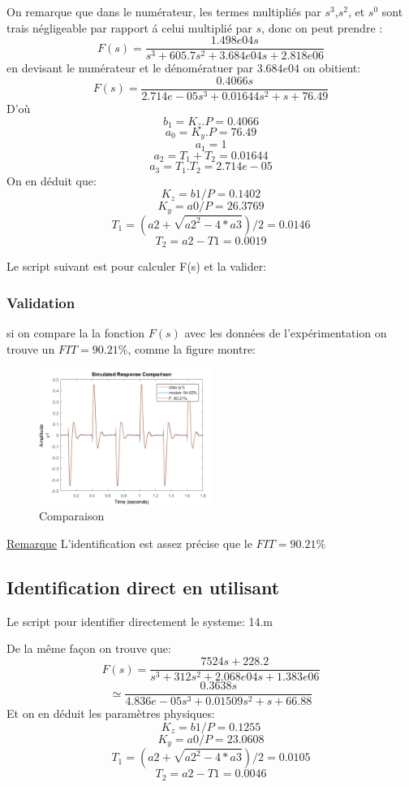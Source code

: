 \documentclass[twoside,twocolumn]{article}
\begin{document}
On remarque que dans le numérateur, les termes multipliés par $s^3$,$s^2$, et $s^0$ sont trais négligeable par rapport á celui multiplié par $s$, donc on peut prendre :
$$ F(s) = \frac{1.498e04 s}{s^3 + 605.7 s^2 + 3.684e04 s + 2.818e06} $$
en devisant le numérateur et le dénomératuer par $3.684e04$ on obitient:
$$F(s)=\frac{0.4066 s}{  2.714e-05 s^3 + 0.01644 s^2 + s + 76.49}$$
D'où 
$$b_1 = K_z.P = 0.4066$$ $$a_0 = K_y.P =  76.49$$ $$a_1 = 1$$ $$a_2 = T_1+T_2 = 0.01644$$ $$a_3 = T_1.T_2 =2.714e-05$$
On en déduit que:
$$K_z = b1 / P = 0.1402$$
$$K_y = a0/P =26.3769 $$
$$T_1 = (a2+\sqrt{a2^2-4*a3})/2 = 0.0146$$
$$T_2 = a2-T1 = 0.0019$$

Le script suivant est pour calculer F(s) et la valider:
\label{matlab}


\subsubsection{Validation}
si on compare la la fonction $F(s)$ avec les données de l'expérimentation on trouve un $FIT=90.21\%$, comme la figure montre:

\begin{figure}[H]
\centering
\includegraphics[width=0.5\textwidth]{Images/15.png}
\caption{ Comparaison}
\end{figure}

\underline{Remarque}
	L'identification est assez précise que le $FIT=90.21\%$

\subsection{Identification direct en utilisant }
Le script pour identifier directement le systeme:
\label{matlab}
 {14.m}

  
  De la même façon on trouve que:
  $$F(s)=\frac{7524 s + 228.2 }{s^3 + 312 s^2 + 2.068e04 s + 1.383e06}$$ $$\simeq \frac{ 0.3638 s}{4.836e-05 s^3 + 0.01509 s^2 + s + 66.88} $$
  Et on en déduit les paramètres physiques:
$$K_z = b1 / P = 0.1255$$
$$K_y = a0/P =23.0608 $$
$$T_1 = (a2+\sqrt{a2^2-4*a3})/2 = 0.0105$$
$$T_2 = a2-T1 = 0.0046$$
\end{document}
